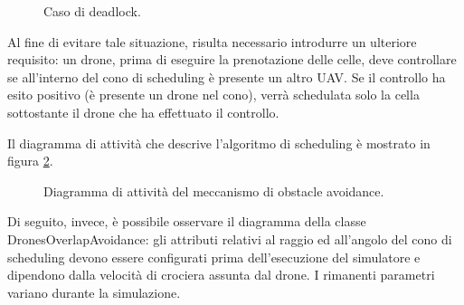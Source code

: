 \begin{enumerate} [label=(\alph*)]
\begin{figure}[H]
\begin{center}
        \end{center}
        \caption[short]{Caso di deadlock.}
        \label{overlapping_c}
    \end{figure}
    Al fine di evitare tale situazione, risulta necessario introdurre un ulteriore requisito: un drone, prima di eseguire la prenotazione delle celle, deve controllare se all'interno del cono di scheduling è presente un altro UAV.
    Se il controllo ha esito positivo (è presente un drone nel cono), verrà schedulata solo la cella sottostante il drone che ha effettuato il controllo.
\end{enumerate}

Il diagramma di attività che descrive l'algoritmo di scheduling è mostrato in figura \ref{activity_scheduling}.

\begin{figure}[H] 
    \captionsetup{justification=centering, margin=2cm, font=footnotesize}
    \begin{center}
    \end{center}
    \caption[short]{Diagramma di attività del meccanismo di obstacle avoidance.}
    \label{activity_scheduling}
\end{figure}

Di seguito, invece, è possibile osservare il diagramma della classe DronesOverlapAvoidance: gli attributi relativi al raggio ed all'angolo del cono di scheduling devono essere configurati prima dell'esecuzione del simulatore e dipendono dalla velocità di crociera assunta dal drone.
I rimanenti parametri variano durante la simulazione.

